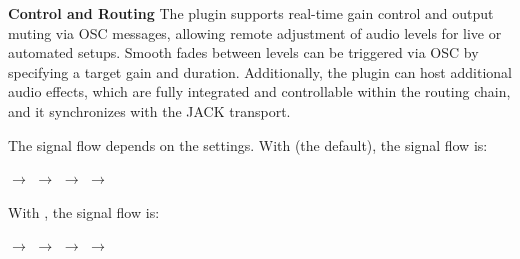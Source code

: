 {\bf Control and Routing} The plugin supports real-time gain control
and output muting via OSC messages, allowing remote adjustment of
audio levels for live or automated setups. Smooth fades between levels
can be triggered via OSC by specifying a target gain and
duration. Additionally, the plugin can host additional audio effects,
which are fully integrated and controllable within the routing chain,
and it synchronizes with the JACK transport.

The signal flow depends on the  settings. With
 (the default), the signal flow is:

 $\rightarrow$  $\rightarrow$  $\rightarrow$  $\rightarrow$ 

With , the signal flow is:

 $\rightarrow$  $\rightarrow$  $\rightarrow$  $\rightarrow$ 


